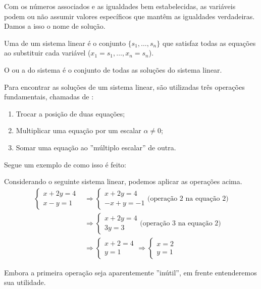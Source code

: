 \documentclass[../main.tex]{subfiles}
\begin{document}
		Com os números associados e as igualdades bem estabelecidas, as variáveis podem ou não assumir valores específicos que mantêm as igualdades verdadeiras. Damos a isso o nome de solução.
		\begin{definicao}
			Uma  de um sistema linear é o conjunto $\{s_1,\dots, s_n\}$ que satisfaz todas as equações ao substituir cada variável ($x_1=s_1,\dots,x_n=s_n$).
		\end{definicao}
		\begin{definicao}
			O  ou a  do sistema é o conjunto de todas as soluções do sistema linear.
		\end{definicao}
		
		Para encontrar as soluções de um sistema linear, são utilizadas três operações fundamentais, chamadas de :
		\begin{enumerate}[nosep]
			\item Trocar a posição de duas equações;
			\item Multiplicar uma equação por um escalar $\alpha\neq0$;
			\item Somar uma equação ao ''múltiplo escalar'' de outra.
		\end{enumerate}
		Segue um exemplo de como isso é feito:
		\begin{exemplo}
			Considerando o seguinte sistema linear, podemos aplicar as operações acima.
			\begin{align*}
				\begin{cases}
					x+2y=4\\
					x-y=1
				\end{cases}
				&\Rightarrow \begin{cases}
					x+2y=4\\
					-x+y=-1
				\end{cases} \text{(operação 2 na equação 2)}\\
				&\Rightarrow \begin{cases}
					x+2y=4\\
					3y=3
				\end{cases} \text{(operação 3 na equação 2)}\\
				&\Rightarrow \begin{cases}
					x+2=4\\
					y=1
				\end{cases}
				\Rightarrow \begin{cases}
					x=2\\
					y=1
				\end{cases}
			\end{align*}
			\label{ex:SLoperacoes}
		\end{exemplo}
		Embora a primeira operação seja aparentemente ''inútil'', em frente entenderemos sua utilidade.
		
\end{document}

